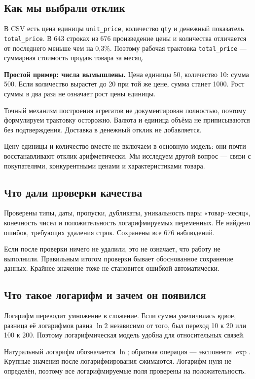 \documentclass[12pt,a4paper]{article}
\newcommand{\toy}[1]{\par\textbf{Простой пример: числа вымышлены.} #1\par}
\begin{document}
\subsection{Как мы выбрали отклик}

В CSV есть цена единицы \texttt{unit\_price}, количество \texttt{qty} и денежный показатель \texttt{total\_price}. В 643 строках из 676 произведение цены и количества отличается от последнего меньше чем на 0,3\%. Поэтому рабочая трактовка \texttt{total\_price} --- суммарная стоимость продаж товара за месяц.

\toy{Цена единицы 50, количество 10: сумма 500. Если количество вырастет до 20 при той же цене, сумма станет 1000. Рост суммы в два раза не означает рост цены единицы.}

Точный механизм построения агрегатов не документирован полностью, поэтому формулируем трактовку осторожно. Валюта и единица объёма не приписываются без подтверждения. Доставка в денежный отклик не добавляется.

Цену единицы и количество вместе не включаем в основную модель: они почти восстанавливают отклик арифметически. Мы исследуем другой вопрос --- связи с покупателями, конкурентными ценами и характеристиками товара.

\subsection{Что дали проверки качества}

Проверены типы, даты, пропуски, дубликаты, уникальность пары «товар--месяц», конечность чисел и положительность логарифмируемых переменных. Не найдено ошибок, требующих удаления строк. Сохранены все 676 наблюдений.

Если после проверки ничего не удалили, это не означает, что работу не выполнили. Правильным итогом проверки бывает обоснованное сохранение данных. Крайнее значение тоже не становится ошибкой автоматически.

\subsection{Что такое логарифм и зачем он появился}

Логарифм переводит умножение в сложение. Если сумма увеличилась вдвое, разница её логарифмов равна $\ln2$ независимо от того, был переход 10 к 20 или 100 к 200. Поэтому логарифмическая модель удобна для относительных связей.

Натуральный логарифм обозначается $\ln$; обратная операция --- экспонента $\exp$. Крупные значения после логарифмирования сжимаются. Логарифм нуля не определён, поэтому все логарифмируемые поля проверены на положительность.
\end{document}
